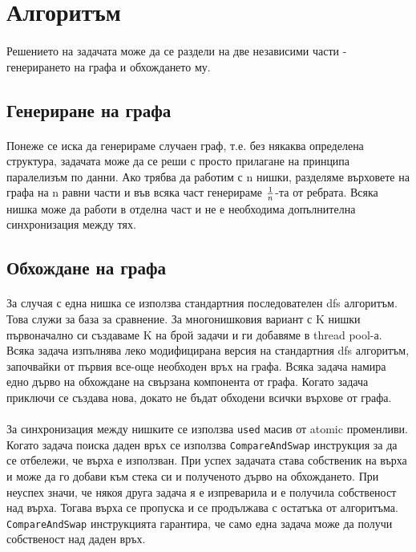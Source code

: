 \section{Алгоритъм}

\paragraph*{} Решението на задачата може да се раздели на две независими части - генерирането на графа и обхождането му.

\subsection{Генериране на графа}

\paragraph*{} Понеже се иска да генерираме случаен граф, т.е. без някаква определена структура, задачата може да се реши с просто прилагане на принципа паралелизъм по данни. Ако трябва да работим с n нишки, разделяме върховете на графа на n равни части и във всяка част генерираме $ 1 \over n $-та от ребрата. Всяка нишка може да работи в отделна част и не е необходима допълнителна синхронизация между тях.

\subsection{Обхождане на графа}

\paragraph*{} За случая с една нишка се използва стандартния последователен dfs алгоритъм. Това служи за база за сравнение. За многонишковия вариант с K нишки първоначално си създаваме K на брой задачи и ги добавяме в thread pool-а. Всяка задача изпълнява леко модифицирана версия на стандартния dfs алгоритъм, започвайки от първия все-още необходен връх на графа. Всяка задача намира едно дърво на обхождане на свързана компонента от графа. Когато задача приключи се създава нова, докато не бъдат обходени всички върхове от графа.

\paragraph*{} За синхронизация между нишките се използва \verb|used| масив от atomic променливи. Когато задача поиска даден връх се използва \verb|CompareAndSwap| инструкция за да се отбележи, че върха е използван. При успех задачата става собственик на върха и може да го добави към стека си и полученото дърво на обхождането. При неуспех значи, че някоя друга задача я е изпреварила и е получила собственост над върха. Тогава върха се пропуска и се продължава с остатъка от алгоритъма. \verb|CompareAndSwap| инструкцията гарантира, че само една задача може да получи собственост над даден връх.

